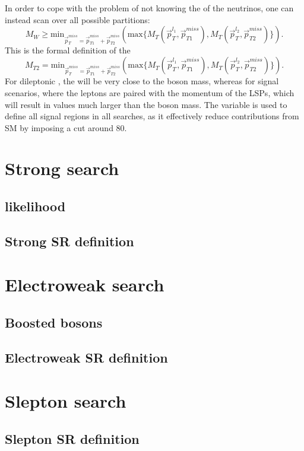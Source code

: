 In order to cope with the problem of not knowing the \pt of the neutrinos, one can instead scan over all possible \ptmiss partitions: 
\begin{equation}
M_{W}\geq \mathrm{min}_{\vec{p}_{T}^{miss}=\vec{p}_{T1}^{miss}+\vec{p}_{T2}^{miss}}\left( \mathrm{max}\{M_{T}\left(\vec{p}_{T}^{l_{1}},\vec{p}_{T1}^{miss}\right), M_{T}\left(\vec{p}_{T}^{l_{2}},\vec{p}_{T2}^{miss}\right)\}\right).
\end{equation}
This is the formal definition of the \mttwo 
\begin{equation}
M_{T2}= \mathrm{min}_{\vec{p}_{T}^{miss}=\vec{p}_{T1}^{miss}+\vec{p}_{T2}^{miss}}\left( \mathrm{max}\{M_{T}\left(\vec{p}_{T}^{l_{1}},\vec{p}_{T1}^{miss}\right), M_{T}\left(\vec{p}_{T}^{l_{2}},\vec{p}_{T2}^{miss}\right)\}\right).
\end{equation}
For dileptonic \ttbar, the \mttwo will be very close to the \PW boson mass, whereas for signal scenarios, where the leptons are paired with the momentum of the LSPs, which will result in values much larger than the \PW boson mass. 
The \mttwo variable is used to define all signal regions in all searches, as it effectively reduce contributions from SM \ttbar by imposing a cut around 80\GeV.
\section{Strong search} 
\subsection{\ttbar likelihood}
\subsection{Strong SR definition}
\section{Electroweak search}
\subsection{Boosted bosons}
\subsection{Electroweak SR definition}
\section{Slepton search}
\subsection{Slepton SR definition}
